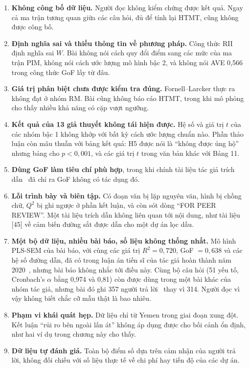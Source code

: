 \begin{enumerate}
  \item \textbf{Không công bố dữ liệu.} Người đọc không kiểm chứng được kết quả. Ngay cả ma trận tương quan giữa các câu hỏi, đủ để tính lại HTMT, cũng không được công bố.
  \item \textbf{Định nghĩa sai và thiếu thông tin về phương pháp.} Công thức RII định nghĩa sai $W$. Bài không nói cách quy đổi điểm sang các mức của ma trận PIM, không nói cách ước lượng mô hình bậc 2, và không nói AVE 0,566 trong công thức GoF lấy từ đâu.
  \item \textbf{Giá trị phân biệt chưa được kiểm tra đúng.} Fornell--Larcker thực ra không đạt ở nhóm RM. Bài cũng không báo cáo HTMT, trong khi mô phỏng cho thấy nhiều khả năng có cặp vượt ngưỡng.
  \item \textbf{Kết quả của 13 giả thuyết không tái hiện được.} Hệ số và giá trị $t$ của các nhóm bậc 1 không khớp với bất kỳ cách ước lượng chuẩn nào. Phần thảo luận còn mâu thuẫn với bảng kết quả: H5 được nói là ``không được ủng hộ'' nhưng bảng cho $p < 0{,}001$, và các giá trị $t$ trong văn bản khác với Bảng 11.
  \item \textbf{Dùng GoF làm tiêu chí phù hợp}, trong khi chính tài liệu tác giả trích dẫn~\cite{henseler2013} đã chỉ ra GoF không có tác dụng đó.
  \item \textbf{Lỗi trình bày và biên tập.} Có đoạn văn bị lặp nguyên văn, hình bị chồng chữ, $Q^2$ bị ghi ngược ở phần kết luận, và còn sót dòng ``FOR PEER REVIEW''. Một tài liệu trích dẫn không liên quan tới nội dung, như tài liệu [45] về cảm biến đường sắt được dẫn cho một dự án lọc dầu.
  \item \textbf{Một bộ dữ liệu, nhiều bài báo, số liệu không thống nhất.} Mô hình PLS-SEM của bài báo, với cùng các giá trị $R^2 = 0{,}720$, GoF $= 0{,}638$ và các hệ số đường dẫn, đã có trong luận án tiến sĩ của tác giả hoàn thành năm 2020~\cite{kassem2020luanan}, nhưng bài báo không nhắc tới điều này. Cùng bộ câu hỏi (51 yếu tố, Cronbach's $\alpha$ bằng 0,974 và 0,81) còn được dùng trong một bài khác của nhóm tác giả, nhưng bài đó ghi 357 người trả lời~\cite{kassem2020rii} thay vì 314. Người đọc vì vậy không biết chắc cỡ mẫu thật là bao nhiêu.
  \item \textbf{Phạm vi khái quát hẹp.} Dữ liệu chỉ từ Yemen trong giai đoạn xung đột. Kết luận ``rủi ro bên ngoài lấn át'' không áp dụng được cho bối cảnh ổn định, như hai ví dụ trong chương này cho thấy.
  \item \textbf{Dữ liệu tự đánh giá.} Toàn bộ điểm số dựa trên cảm nhận của người trả lời, không đối chiếu với số liệu thực tế về chi phí hay tiến độ của các dự án.
\end{enumerate}

